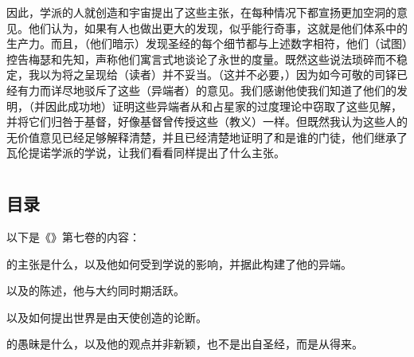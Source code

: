 因此，学派的人就创造和宇宙提出了这些主张，在每种情况下都宣扬更加空洞的意见。他们认为，如果有人也做出更大的发现，似乎能行奇事，这就是他们体系中的生产力。而且，（他们暗示）发现圣经的每个细节都与上述数字相符，他们（试图）控告梅瑟和先知，声称他们寓言式地谈论了永世的度量。既然这些说法琐碎而不稳定，我以为将之呈现给（读者）并不妥当。（这并不必要，）因为如今可敬的司铎已经有力而详尽地驳斥了这些（异端者）的意见。我们感谢他使我们知道了他们的发明，（并因此成功地）证明这些异端者从和占星家的过度理论中窃取了这些见解，并将它们归咎于基督，好像基督曾传授这些（教义）一样。但既然我认为这些人的无价值意见已经足够解释清楚，并且已经清楚地证明了和是谁的门徒，他们继承了瓦伦提诺学派的学说，让我们看看同样提出了什么主张。\par



\section{}


\subsection{目录}

以下是《》第七卷的内容：\par

的主张是什么，以及他如何受到学说的影响，并据此构建了他的异端。\par

以及的陈述，他与大约同时期活跃。\par

以及如何提出世界是由天使创造的论断。\par

的愚昧是什么，以及他的观点并非新颖，也不是出自圣经，而是从得来。\par

